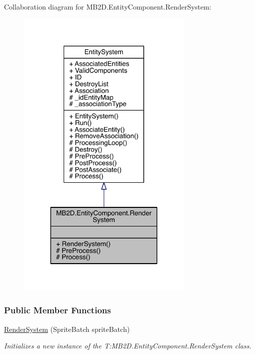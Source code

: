 Collaboration diagram for M\+B2\+D.\+Entity\+Component.\+Render\+System\+:
\nopagebreak
\begin{figure}[H]
\begin{center}
\leavevmode
\includegraphics[width=239pt]{class_m_b2_d_1_1_entity_component_1_1_render_system__coll__graph}
\end{center}
\end{figure}
\subsubsection*{Public Member Functions}
\begin{DoxyCompactItemize}
\item 
\hyperlink{class_m_b2_d_1_1_entity_component_1_1_render_system_a3f09291aad8620444cc5248def8431b2}{Render\+System} (Sprite\+Batch sprite\+Batch)
\begin{DoxyCompactList}\small\item\em Initializes a new instance of the T\+:\+M\+B2\+D.\+Entity\+Component.\+Render\+System class. \end{DoxyCompactList}\end{DoxyCompactItemize}
